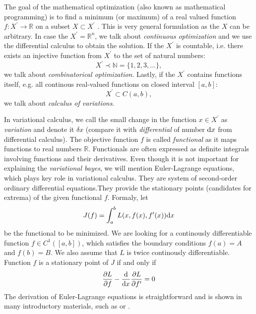 The goal of the mathematical optimization (also known as mathematical programming) is to find a minimum (or maximum) of a real valued function 
$f: X^\prime \to \mathbb{R}$ on a subset $X \subset X^\prime$ \cite{werner-opt-2022}. This is very general formulation as the $X$ can be arbitrary.
In case the $X^\prime = \mathbb{R}^n$, we talk about \textit{continuous optimization} and we use the differential calculus to obtain the solution.
If the $X^\prime$ is countable, i.e. there exists an injective function from $X^\prime$ to the set of natural numbers:
$$
X^\prime  \prec \mathbb{N} = \{1,2,3,...\},
$$
we talk about \textit{combinatorical optimization}.
Lastly, if the $X^\prime$ contains functions itself, e.g. all continous real-valued functions on closed interval $[a,b]$:
$$
X^\prime \subset C(a,b),
$$
we talk about \textit{calculus of variations}. 

In variational calculus, we call the small change in the function $x \in X^\prime$ as \textit{variation} and denote it $\delta x$
(compare it with  \textit{differential} of number $\mbox{\rm d}x$ from differential calculus). The objective function $f$ is called \textit{functional} as 
it maps functions to real numbers $\mathbb{R}$. Functionals are often expressed as definite integrals involving functions and their derivatives.
Even though it is not important for explaining the \textit{variational bayes}, we will mention Euler-Lagrange equations, which plays key role in 
variational calculus. They are system of second-order ordinary differential equations\cite{intro-variational-calc-2003}.They provide the 
stationary points (candidates for extrema) of the given functional $f$. Formaly, let 
\begin{equation*}
    J(f) = \int_a^b L(x,f(x),f^\prime(x)) \mbox{\rm d}x 
\end{equation*}
be the functional to be minimized. We are looking for a continously differentiable function\cite{smooth-functions-2023} $f \in C^1([a,b])$, which satisfies the boundary conditions $f(a) = A$ and $f(b) = B$.
We also assume that $L$ is twice continously differentiable. Function $f$ is a stationary point of $J$ if and only if
\begin{equation*}
    \frac{\partial L}{\partial f} - \frac{\d}{\d x} \frac{\partial L}{\partial f^\prime} = 0 
\end{equation*}
The derivation of Euler-Lagrange equations is straightforward and is shown in many introductory materials, such as \cite{hurak-2021} or \cite{kulhanek-2016}.

